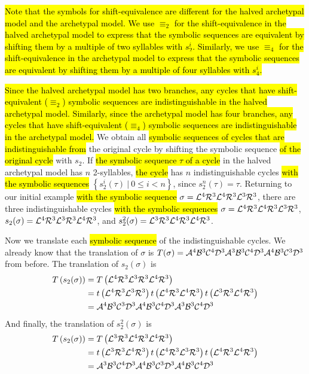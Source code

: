 \hl{
	Note that the symbols for shift-equivalence are different for the halved archetypal model and the archetypal model.
	We use $\equiv_2$ for the shift-equivalence in the halved archetypal model to express that the symbolic sequences are equivalent by shifting them by a multiple of two syllables with $s_2^i$.
	Similarly, we use $\equiv_4$ for the shift-equivalence in the archetypal model to express that the symbolic sequences are equivalent by shifting them by a multiple of four syllables with $s_4^i$.
}

\hl{
	Since the halved archetypal model has two branches, any cycles that have shift-equivalent ($\equiv_2$) symbolic sequences are indistinguishable in the halved archetypal model.
	Similarly, since the archetypal model has four branches, any cycles that have shift-equivalent ($\equiv_4$) symbolic sequences are indistinguishable in the archetypal model.
}
We obtain all \hl{symbolic sequences of cycles that are indistinguishable from} the original cycle by shifting the symbolic sequence \hl{of the original cycle} with $s_2$.
If \hl{the symbolic sequence $\tau$ of a cycle} in the halved archetypal model has $n$ 2-syllables, \hl{the cycle} has $n$ indistinguishable cycles \hl{with the symbolic sequences} $\left\{s_2^i(\tau) \:|\: 0 \leq i < n\right\}$, since $s_2^n(\tau) = \tau$.
Returning to our initial example \hl{with the symbolic sequence} $\sigma = \mathcal{L}^4\mathcal{R}^3\mathcal{L}^4\mathcal{R}^3\mathcal{L}^3\mathcal{R}^3$, there are three indistinguishable cycles \hl{with the symbolic sequences} $\sigma = \mathcal{L}^4\mathcal{R}^3\mathcal{L}^4\mathcal{R}^3\mathcal{L}^3\mathcal{R}^3$, $s_2(\sigma) = \mathcal{L}^4\mathcal{R}^3\mathcal{L}^3\mathcal{R}^3\mathcal{L}^4\mathcal{R}^3$, and $s_2^2(\sigma) = \mathcal{L}^3\mathcal{R}^3\mathcal{L}^4\mathcal{R}^3\mathcal{L}^4\mathcal{R}^3$.

Now we translate each \hl{symbolic sequence} of the indistinguishable cycles.
We already know that the translation of $\sigma$ is $T(\sigma) = \mathcal{A}^4\mathcal{B}^3\mathcal{C}^4\mathcal{D}^3\mathcal{A}^3\mathcal{B}^3\mathcal{C}^4\mathcal{D}^3\mathcal{A}^4\mathcal{B}^3\mathcal{C}^3\mathcal{D}^3$ from before.
The translation of $s_2(\sigma)$ is %
\begin{align*}
	T\left(s_2(\sigma)\right) & = T\left(\mathcal{L}^4\mathcal{R}^3\mathcal{L}^3\mathcal{R}^3\mathcal{L}^4\mathcal{R}^3\right)                                                       \\
	                          & = t\left(\mathcal{L}^4\mathcal{R}^3\mathcal{L}^3\mathcal{R}^3\right) t\left(\mathcal{L}^4\mathcal{R}^3\mathcal{L}^4\mathcal{R}^3\right) t\left(\mathcal{L}^3\mathcal{R}^3\mathcal{L}^4\mathcal{R}^3\right) \\
	                          & = \mathcal{A}^4\mathcal{B}^3\mathcal{C}^3\mathcal{D}^3\mathcal{A}^4\mathcal{B}^3\mathcal{C}^4\mathcal{D}^3\mathcal{A}^3\mathcal{B}^3\mathcal{C}^4\mathcal{D}^3
\end{align*}
And finally, the translation of $s_2^2(\sigma)$ is %
\begin{align*}
	T\left(s_2(\sigma)\right) & = T\left(\mathcal{L}^3\mathcal{R}^3\mathcal{L}^4\mathcal{R}^3\mathcal{L}^4\mathcal{R}^3\right)                                                       \\
	                          & = t\left(\mathcal{L}^3\mathcal{R}^3\mathcal{L}^4\mathcal{R}^3\right) t\left(\mathcal{L}^4\mathcal{R}^3\mathcal{L}^3\mathcal{R}^3\right) t\left(\mathcal{L}^4\mathcal{R}^3\mathcal{L}^4\mathcal{R}^3\right) \\
	                          & = \mathcal{A}^3\mathcal{B}^3\mathcal{C}^4\mathcal{D}^3\mathcal{A}^4\mathcal{B}^3\mathcal{C}^3\mathcal{D}^3\mathcal{A}^4\mathcal{B}^3\mathcal{C}^4\mathcal{D}^3
\end{align*}

